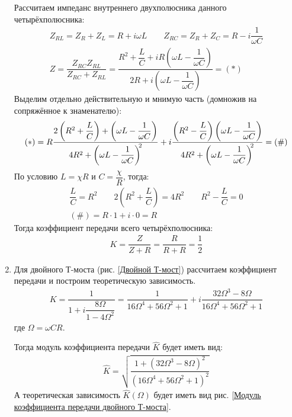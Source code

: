 \documentclass[a4paper, usenames, dvipsnames]{article}
\begin{document}
\begin{enumerate}
          Рассчитаем импеданс внутреннего двухполюсника данного четырёхполюсника:
          \begin{gather*}
              Z_{RL} = Z_R + Z_L = R + i\omega L \hspace{2em} Z_{RC} = Z_R + Z_C = R - i\dfrac{1}{\omega C}\\
              Z = \dfrac{Z_{RC}Z_{RL}}{Z_{RC} + Z_{RL}} = \dfrac{R^2 + \dfrac{L}{C} + iR\left(\omega L - \dfrac{1}{\omega C}\right)}{2R + i\left(\omega L - \dfrac{1}{\omega C}\right)} = (*)
          \end{gather*}
          Выделим отдельно действительную и мнимую часть (домножив на сопряжённое к знаменателю):
          \begin{gather*}
              (*) = R \dfrac{2\left(R^2 + \dfrac{L}{C}\right) + \left(\omega L - \dfrac{1}{\omega C}\right)}{4R^2 + \left(\omega L - \dfrac{1}{\omega C}\right)^{\hspace{-0.25em}2}} + i\dfrac{\left(R^2 - \dfrac{L}{C}\right)\left(\omega L - \dfrac{1}{\omega C}\right)}{4R^2 + \left(\omega L - \dfrac{1}{\omega C}\right)^{\hspace{-0.25em}2}} = (\#)
          \end{gather*}
          По условию $L = \chi R$ и $C = \dfrac{\chi}{R}$, тогда:
          \begin{gather*}
              \dfrac{L}{C} = R^2 \hspace{2em} 2\left(R^2 + \dfrac{L}{C}\right) = 4R^2 \hspace{2em} R^2 - \dfrac{L}{C} = 0\\
              (\#) = R \cdot 1 + i \cdot 0 = R
          \end{gather*}
          Тогда коэффициент передачи всего четырёхполюсника:
          \begin{gather*}
              K = \dfrac{Z}{Z + R} = \dfrac{R}{R + R} = \dfrac{1}{2}
          \end{gather*}

    \item Для двойного Т-моста (рис. \ref{Двойной Т-мост}) рассчитаем коэффициент передачи и построим теоретическую зависимость.
          \begin{gather*}
              K = \dfrac{1}{1 + i\dfrac{8 \Omega}{1 - 4\Omega^2}} = \dfrac{1}{16\Omega^4 + 56\Omega^2 + 1} + i\dfrac{32\Omega^3 - 8\Omega}{16\Omega^4 + 56\Omega^2 + 1}
          \end{gather*}
          где $\Omega = \omega CR$.

          Тогда модуль коэффициента передачи $\hat{K}$ будет иметь вид:
          \begin{gather*}
              \hat{K} = \sqrt{\dfrac{1 + \left(32\Omega^3 - 8\Omega\right)^2}{\left(16\Omega^4 + 56\Omega^2 + 1\right)^2}}
          \end{gather*}
          А теоретическая зависимость $\hat{K}(\Omega)$ будет иметь вид рис. \ref{Модуль коэффициента передачи двойного Т-моста}.
\end{enumerate}
\end{document}

